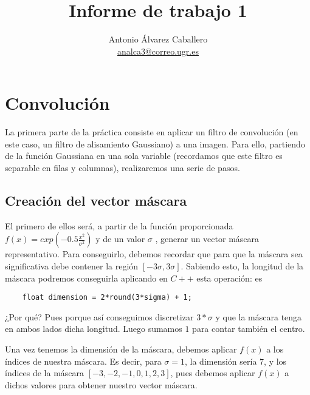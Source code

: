 \documentclass[a4paper, 11pt]{article}
\title{Informe de trabajo 1}
\author{Antonio Álvarez Caballero\\
    \href{mailto:analca3@correo.ugr.es}{analca3@correo.ugr.es}}
\date{}
\theoremstyle{definition}
\begin{document}
  \maketitle

  \section{Convolución}

  La primera parte de la práctica consiste en aplicar un filtro de convolución
  (en este caso, un filtro de alisamiento Gaussiano) a una imagen. Para ello,
  partiendo de la función Gaussiana en una sola variable (recordamos que este filtro
  es separable en filas y columnas), realizaremos una serie de pasos.

  \subsection{Creación del vector máscara}

  El primero de ellos será, a partir de la función proporcionada $f(x)=exp(-0.5\frac{x^2}{\sigma^2})$
  y de un valor $\sigma$ , generar un vector máscara representativo. Para conseguirlo,
  debemos recordar que para que la máscara sea significativa debe contener la región
  $[-3\sigma,3\sigma]$. Sabiendo esto, la longitud de la máscara podremos conseguirla
  aplicando en $C++$ esta operación:
  es

  \begin{lstlisting}
    float dimension = 2*round(3*sigma) + 1;
  \end{lstlisting}

  ¿Por qué? Pues porque así conseguimos discretizar $3*\sigma$ y que la máscara
  tenga en ambos lados dicha longitud. Luego sumamos $1$ para contar también el centro.

  Una vez tenemos la dimensión de la máscara, debemos aplicar $f(x)$ a los índices
  de nuestra máscara. Es decir, para $\sigma = 1$, la dimensión sería $7$, y los
  índices de la máscara $[-3,-2,-1,0,1,2,3]$, pues debemos aplicar $f(x)$ a dichos
  valores para obtener nuestro vector máscara.
\end{document}
